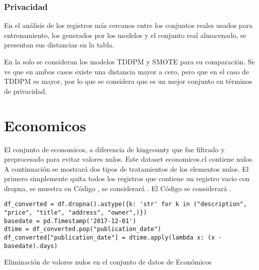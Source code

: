 

\newpage
\subsubsection{Privacidad}
En el análisis de los registros más cercanos entre los conjuntos reales usados para entrenamiento, los generados por los modelos y el conjunto real almacenado, se presentan sus distancias en la tabla.





%
%
%

En la  solo se consideran los modelos TDDPM y SMOTE para su comparación. Se ve que en ambos casos existe una distancia mayor a cero, pero que en el caso de TDDPM es mayor, por lo que se considera que es un mejor conjunto en términos de privacidad.




\newpage
\section{Economicos}
El conjunto de economicos, a diferencia de kingcounty que fue filtrado y preprocesado para evitar valores nulos. Este dataset economicos.cl contiene nulos. A continuación se mostrará dos tipos de tratamientos de los elementos nulos. El primero simplemente quita todos los registros que contiene un registro vacio con dropna, se muestra en Código , se considerará . El Código  se considerará .


\begin{listing}[H]
    \begin{verbatim}
df_converted = df.dropna().astype({k: 'str' for k in ("description", "price", "title", "address", "owner",)})
basedate = pd.Timestamp('2017-12-01')
dtime = df_converted.pop("publication_date")
df_converted["publication_date"] = dtime.apply(lambda x: (x - basedate).days)
    \end{verbatim}
\caption{Eliminación de valores nulos en el conjunto de datos de Económicos}
\label{codigo-remove-nan}
\end{listing}

